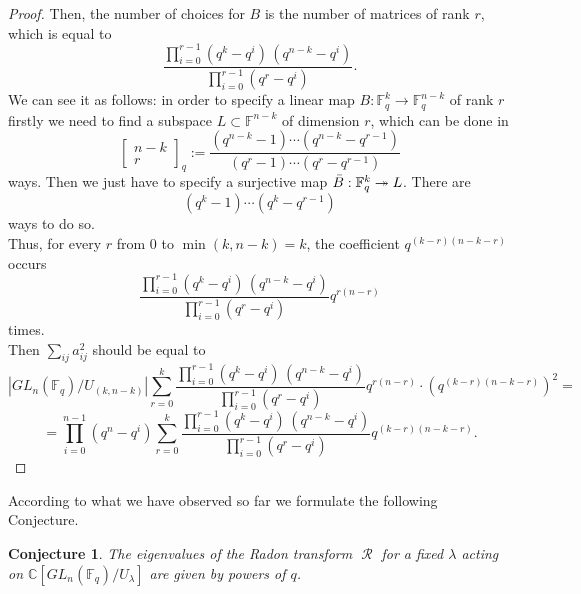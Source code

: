 \documentclass[12pt,reqno]{amsart}
\newtheorem{conj}[thm]{Conjecture}
\theoremstyle{definition}
\theoremstyle{remark}
\numberwithin{equation}{section}
\newcommand{\CC}{\mathbb{C}}
\newcommand{\GL}[1]{GL_{#1}(\mathbb{F}_q)}
\DeclareMathOperator{\R}{\mathcal{R}}
\begin{document}
\begin{proof}
Then, the number of choices for $B$ is the number of matrices of rank $r$, which is equal to
\[
    \frac{\displaystyle\prod_{i=0}^{r-1} (q^k - q^i)\,(q^{n-k} - q^i)}
{\displaystyle\prod_{i=0}^{r-1} (q^r - q^i)}.
\]
We can see it as follows: in order to specify a linear map $B: \mathbb{F}_q^{k} \rightarrow \mathbb{F}_q^{n-k}$ of rank $r$ firstly we need to find a subspace $L\subset \mathbb{F}^{n-k}$ of dimension $r$, which can be done in 
\[
\begin{bmatrix}
    n-k\\
    r
\end{bmatrix}_q:=\frac{(q^{n-k}-1)\cdots (q^{n-k}-q^{r-1})}{(q^r-1)\cdots (q^r-q^{r-1})}
\]
ways. Then we just have to specify a surjective map $\Bar{B}:\mathbb{F}_q^k \twoheadrightarrow L$. There are
\[
(q^k-1)\cdots (q^k-q^{r-1})
\]
ways to do so.\\

Thus, for every $r$ from $0$ to $\min(k, n-k)=k$, the coefficient $q^{(k-r)(n-k-r)}$ occurs
\[\frac{\displaystyle\prod_{i=0}^{r-1} (q^k - q^i)\,(q^{n-k} - q^i)}
{\displaystyle\prod_{i=0}^{r-1} (q^r - q^i)} q^{r(n-r)}\]
times.\\

Then $\sum_{ij}a_{ij}^2$ should be equal to
\begin{equation*}
|\GL{n} / U_{(k,n-k)}| \sum_{r = 0}^{k}
\frac{\displaystyle\prod_{i=0}^{r-1} (q^k - q^i)\,(q^{n-k} - q^i)}
{\displaystyle\prod_{i=0}^{r-1} (q^r - q^i)} q^{r(n-r)} \cdot \left(q^{(k-r)(n-k-r)}\right)^2=
\end{equation*}
\begin{equation*}
=\prod_{i=0}^{n-1}(q^n-q^i) \sum_{r = 0}^{k}
\frac{\displaystyle\prod_{i=0}^{r-1} (q^k - q^i)\,(q^{n-k} - q^i)}
{\displaystyle\prod_{i=0}^{r-1} (q^r - q^i)} q^{(k-r)(n-k-r)}.
\end{equation*}
\end{proof}

According to what we have observed so far we formulate the following Conjecture.

\begin{conj}\label{Conjecture}
    The eigenvalues of the Radon transform $\R$ for a fixed $\lambda$ acting on $\CC[\GL{n}/U_{\lambda}]$ are given by powers of $q$.
\end{conj}
\end{document}
